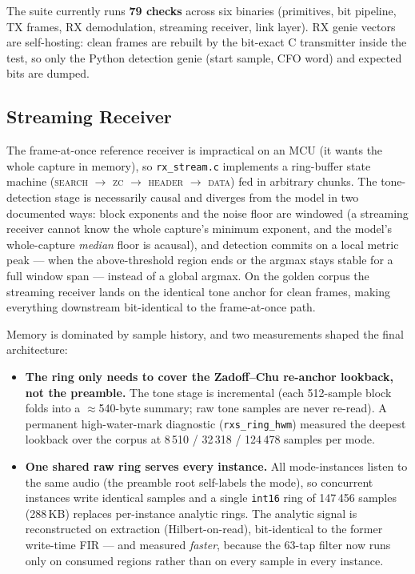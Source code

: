 The suite currently runs \textbf{79 checks} across six binaries
(primitives, bit pipeline, TX frames, RX demodulation, streaming
receiver, link layer).  RX genie vectors are self-hosting: clean frames
are rebuilt by the bit-exact C transmitter inside the test, so only the
Python detection genie (start sample, CFO word) and expected bits are
dumped.

\subsection{Streaming Receiver}
\label{sec:cport_stream}

The frame-at-once reference receiver is impractical on an MCU (it wants
the whole capture in memory), so \texttt{rx\_stream.c} implements a
ring-buffer state machine (\textsc{search} $\rightarrow$ \textsc{zc}
$\rightarrow$ \textsc{header} $\rightarrow$ \textsc{data}) fed in
arbitrary chunks.  The tone-detection stage is necessarily causal and
diverges from the model in two documented ways: block exponents and the
noise floor are windowed (a streaming receiver cannot know the whole
capture's minimum exponent, and the model's whole-capture \emph{median}
floor is acausal), and detection commits on a local metric peak ---
when the above-threshold region ends or the argmax stays stable for a
full window span --- instead of a global argmax.  On the golden corpus
the streaming receiver lands on the identical tone anchor for clean
frames, making everything downstream bit-identical to the
frame-at-once path.

Memory is dominated by sample history, and two measurements shaped the
final architecture:

\begin{itemize}
    \item \textbf{The ring only needs to cover the Zadoff--Chu
          re-anchor lookback, not the preamble.}  The tone stage is
          incremental (each 512-sample block folds into a
          $\approx$540-byte summary; raw tone samples are never
          re-read).  A permanent high-water-mark diagnostic
          (\texttt{rxs\_ring\_hwm}) measured the deepest lookback over
          the corpus at 8\,510 / 32\,318 / 124\,478 samples per mode.
    \item \textbf{One shared raw ring serves every instance.}  All
          mode-instances listen to the same audio (the preamble root
          self-labels the mode), so concurrent instances write
          identical samples and a single \texttt{int16} ring of
          147\,456 samples (288\,KB) replaces per-instance analytic
          rings.  The analytic signal is reconstructed on extraction
          (Hilbert-on-read), bit-identical to the former write-time
          FIR --- and measured \emph{faster}, because the 63-tap filter
          now runs only on consumed regions rather than on every
          sample in every instance.
\end{itemize}

